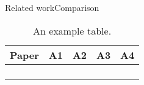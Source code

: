 
\begin{frame}{Related work}{Comparison}
	\begin{table}
		\begin{tabular}{c|c|c|c|c}
			Paper & A1 & A2 & A3 & A4 \\\hline
				  &    &    &    & \\\hline
				  &    &    &    & \\\hline
				  &    &    &    & \\\hline
				  &    &    &    & 
		\end{tabular}
		\caption{\label{tab:Tableju} An example table.}
	\end{table}
\end{frame}

